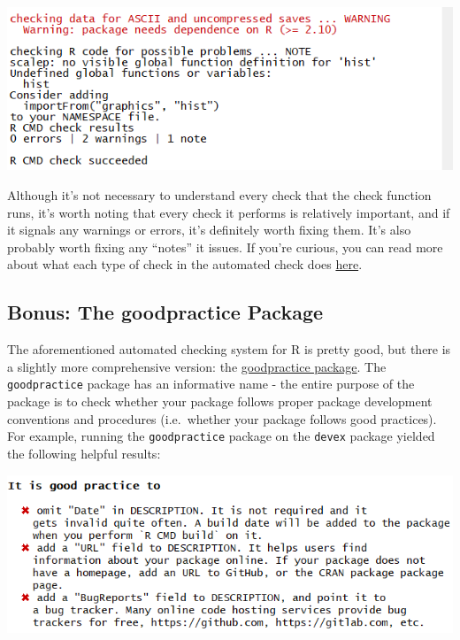 \documentclass[
]{book}
\begin{document}
\includegraphics{images/testSS/autobuildresults.PNG}

Although it's not necessary to understand every check that the check function runs, it's worth noting that every check it performs is relatively important, and if it signals any warnings or errors, it's definitely worth fixing them. It's also probably worth fixing any ``notes'' it issues. If you're curious, you can read more about what each type of check in the automated check does \href{http://r-pkgs.had.co.nz/check.html\#check}{here}.

\hypertarget{bonus-the-goodpractice-package}{%
\subsection{Bonus: The goodpractice Package}\label{bonus-the-goodpractice-package}}

The aforementioned automated checking system for R is pretty good, but there is a slightly more comprehensive version: the \href{https://github.com/MangoTheCat/goodpractice/blob/master/vignettes/goodpractice.Rmd}{goodpractice package}. The \texttt{goodpractice} package has an informative name - the entire purpose of the package is to check whether your package follows proper package development conventions and procedures (i.e.~whether your package follows good practices). For example, running the \texttt{goodpractice} package on the \texttt{devex} package yielded the following helpful results:

\includegraphics{images/testSS/goodpractice1.PNG}
\end{document}
